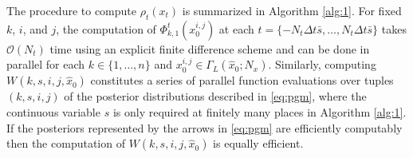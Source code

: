 \documentclass[letterpaper,10pt,conference]{ieeetran}
\newtheorem{thm}{Theorem}
\begin{document}
The procedure to compute  $\rho_t(x_t)$ is summarized in Algorithm \ref{alg:1}.
For fixed $k$, $i$, and $j$, the computation of $\Phi_{k,1}^t(x_0^{i,j})$ at each $t = \{-N_t \Delta t \bar{s} ,\dots, N_t \Delta t \bar{s}\}$ takes $\mathcal{O}(N_t)$ time using an explicit finite difference scheme and can be done in parallel for each $k \in \{1,\dots, n\}$ and $x_0^{i,j} \in \Gamma_L( \hat{x}_0; N_x)$.
Similarly, computing $W(k,s,i,j,\hat{x}_0)$ constitutes a series of parallel function evaluations over tuples $(k,s,i,j)$ of the posterior distributions described in \eqref{eq:pgm}, where the continuous variable $s$ is only required at finitely many places in Algorithm \ref{alg:1}.
If the posteriors represented by the arrows in \eqref{eq:pgm} are efficiently computably then the computation of $W(k,s,i,j, \hat{x}_0)$ is equally efficient.
\end{document}
